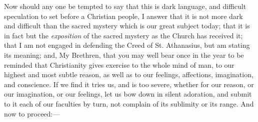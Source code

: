 Now should any one be tempted to say that this is dark language,
and difficult speculation to set before a Christian people, I answer
that it is not more dark and difficult than the sacred mystery which
is our great subject today; that it is in fact but the \emph{exposition}
of the sacred mystery as the Church has received it; that I am not
engaged in defending the Creed of St. Athanasius, but am stating its
meaning; and, My Brethren, that you may well bear once in the year to
be reminded that Christianity gives exercise to the whole mind of man,
to our highest and most subtle reason, as well as to our feelings,
affections, imagination, and conscience. If we find it tries us, and
is too severe, whether for our reason, or our imagination, or our
feelings, let us bow down in silent adoration, and submit to it each
of our faculties by turn, not complain of its sublimity or its range.
And now to proceed:—

